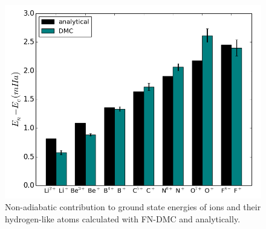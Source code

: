 \documentclass[pra,superscriptaddress,groupedaddress,twocolumn]{revtex4-1}
\begin{document}
\begin{figure}[h]
\includegraphics[scale=.4]{Figures/analytical}
\caption{Non-adiabatic contribution to ground state energies of ions and their hydrogen-like atoms calculated with FN-DMC and analytically. \label{fig:analytical}}
\end{figure}
\end{document}
